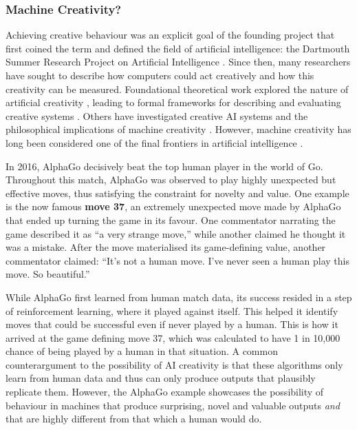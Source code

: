 \subsubsection{Machine Creativity?}

Achieving creative behaviour was an explicit goal of the founding project that first coined the term and defined the field of artificial intelligence: the Dartmouth Summer Research Project on Artificial Intelligence \citep{McCarthy1955-ls}. Since then, many researchers have sought to describe how computers could act creatively and how this creativity can be measured. Foundational theoretical work explored the nature of artificial creativity \citep{Boden1998-yn, Boden2003-hk}, leading to formal frameworks for describing and evaluating creative systems \citep{Wiggins2006-zd, Jordanous2012-kw}. Others have investigated creative AI systems and the philosophical implications of machine creativity \citep{Colton2012-jc, Bown2012-gg, Moruzzi2020-mw}. However, machine creativity has long been considered one of the final frontiers in artificial intelligence \citep{Colton2021-bt}.

In 2016, AlphaGo decisively beat the top human player in the world of Go. Throughout this match, AlphaGo was observed to play highly unexpected but effective moves, thus satisfying the constraint for novelty and value. One example is the now famous \textbf{move 37}, an extremely unexpected move made by AlphaGo that ended up turning the game in its favour. One commentator narrating the game described it as ``a very strange move,'' while another claimed he thought it was a mistake. After the move materialised its game-defining value, another commentator claimed: ``It's not a human move. I've never seen a human play this move. So beautiful.''

While AlphaGo first learned from human match data, its success resided in a step of reinforcement learning, where it played against itself. This helped it identify moves that could be successful even if never played by a human. This is how it arrived at the game defining move 37, which was calculated to have 1 in 10,000 chance of being played by a human in that situation. A common counterargument to the possibility of AI creativity is that these algorithms only learn from human data and thus can only produce outputs that plausibly replicate them. However, the AlphaGo example showcases the possibility of behaviour in machines that produce surprising, novel and valuable outputs \textit{and} that are highly different from that which a human would do.

